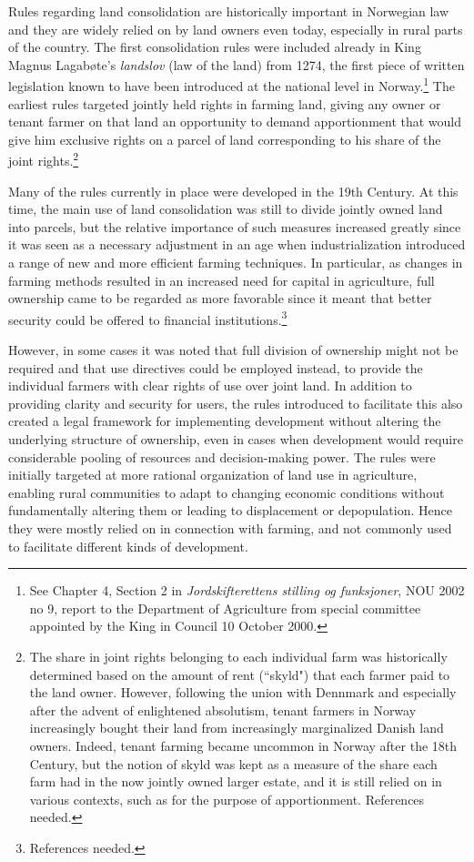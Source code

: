 \documentclass[10pt]{article} %
\begin{document}
Rules regarding land consolidation are historically important in Norwegian law and they are widely relied on by land owners even today, especially in rural parts of the country. The first consolidation rules were included already in King Magnus Lagabøte's \emph{landslov} (law of the land) from 1274, the first piece of written legislation known to have been introduced at the national level in Norway.\footnote{See Chapter 4, Section 2 in \emph{Jordskifterettens stilling og funksjoner}, NOU 2002 no 9, report to the Department of Agriculture from special committee appointed by the King in Council 10 October 2000.} The earliest rules targeted jointly held rights in farming land, giving any owner or tenant farmer on that land an opportunity to demand apportionment that would give him exclusive rights on a parcel of land corresponding to his share of the joint rights.\footnote{The share in joint rights belonging to each individual farm was historically determined based on the amount of rent (``skyld") that each farmer paid to the land owner. However, following the union with Dennmark and especially after the advent of enlightened absolutism, tenant farmers in Norway increasingly bought their land from increasingly marginalized Danish land owners. Indeed, tenant farming became uncommon in Norway after the 18th Century, but the notion of skyld was kept as a measure of the share each farm had in the now jointly owned larger estate, and it is still relied on in various contexts, such as for the purpose of apportionment. References needed.}

Many of the rules currently in place were developed in the 19th Century. At this time, the main use of land consolidation was still to divide jointly owned land into parcels, but the relative importance of such measures increased greatly since it was seen as a necessary adjustment in an age when industrialization introduced a range of new and more efficient farming techniques. In particular, as changes in farming methods resulted in an increased need for capital in agriculture, full ownership came to be regarded as more favorable since it meant that better security could be offered to financial institutions.\footnote{References needed.} 

However, in some cases it was noted that full division of ownership might not be required and that use directives could be employed instead, to provide the individual farmers with clear rights of use over joint land. In addition to providing clarity and security for users, the rules introduced to facilitate this also created a legal framework for implementing development without altering the underlying structure of ownership, even in cases when development would require considerable pooling of resources and decision-making power. The rules were initially targeted at more rational organization of land use in agriculture, enabling rural communities to adapt to changing economic conditions without fundamentally altering them or leading to displacement or depopulation. Hence they were mostly relied on in connection with farming, and not commonly used to facilitate different kinds of development.
\end{document}
